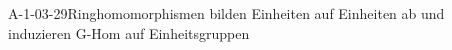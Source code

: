 
\begin{PROP}{A-1-03-29}{Ringhomomorphismen bilden Einheiten auf Einheiten ab und induzieren G-Hom auf Einheitsgruppen}
\end{PROP}
